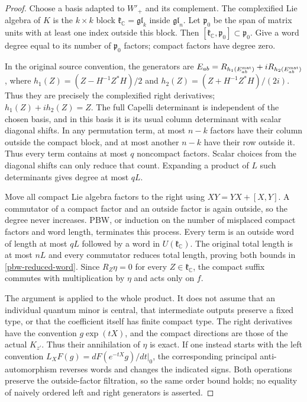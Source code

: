 \begin{proof}
Choose a basis adapted to $W'_+$ and its complement.  The
complexified Lie algebra of $K$ is the $k\times k$ block
$\mathfrak k_{\mathbb C}=\mathfrak{gl}_k$ inside
$\mathfrak{gl}_n$.  Let $\mathfrak p_0$ be the span of matrix
units with at least one index outside this block.  Then
$[\mathfrak k_{\mathbb C},\mathfrak p_0]\subset\mathfrak p_0$.
Give a word degree equal to its number of $\mathfrak p_0$ factors;
compact factors have degree zero.

In the original source convention, the generators are
$E_{ab}=R_{h_1(E_{ab}^{\rm mat})}
       +iR_{h_2(E_{ab}^{\rm mat})}$, where
$h_1(Z)=(Z-H^{-1}Z^*H)/2$ and
$h_2(Z)=(Z+H^{-1}Z^*H)/(2i)$.  Thus they are precisely the
complexified right derivatives; $h_1(Z)+ih_2(Z)=Z$.
The full Capelli determinant is independent of the chosen basis,
and in this basis it is its usual column determinant with scalar
diagonal shifts.  In any permutation term, at most $n-k$ factors
have their column outside the compact block, and at most another
$n-k$ have their row outside it.  Thus every term contains at most
$q$ noncompact factors.  Scalar choices from the diagonal shifts
can only reduce that count.  Expanding a product of $L$ such
determinants gives degree at most $qL$.

Move all compact Lie algebra factors to the right using
$XY=YX+[X,Y]$.  A commutator of a compact factor and an outside
factor is again outside, so the degree never increases.  PBW,
or induction on the number of misplaced compact factors and word
length, terminates this process.  Every term is an outside word
of length at most $qL$ followed by a word in
$U(\mathfrak k_{\mathbb C})$.  The original total length is
at most $nL$ and every commutator reduces total length, proving
both bounds in \eqref{pbw-reduced-word}.  Since $R_Z\eta=0$
for every $Z\in\mathfrak k_{\mathbb C}$, the compact suffix
commutes with multiplication by $\eta$ and acts only on $f$.

The argument is applied to the whole product.  It does not assume
that an individual quantum minor is central, that intermediate
outputs preserve a fixed type, or that the coefficient itself
has finite compact type.  The right derivatives have the
convention $g\exp(tX)$, and the compact directions are those of
the actual $K_{z'}$.  Thus their annihilation of $\eta$ is exact.
If one instead starts with the left convention
$L_XF(g)=dF(e^{-tX}g)/dt|_0$, the corresponding principal
anti-automorphism reverses words and changes the indicated signs.
Both operations preserve the outside-factor filtration, so the
same order bound holds; no equality of naively ordered left and
right generators is asserted.
\end{proof}

